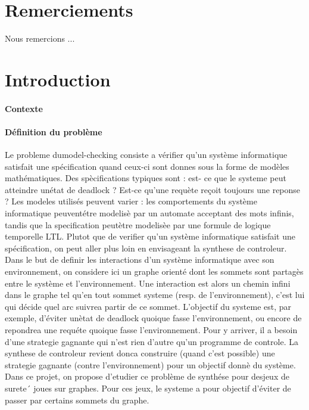 \documentclass[12pt,a4paper,oneside, titlepage]{report}
\begin{document}

{}
\chapter*{Remerciements}
\renewcommand{\leftmark}{REMERCIEMENTS}

Nous remercions ...\\

\newpage
\renewcommand{\leftmark}{TABLE DES MATI\`{E}RES}
\thispagestyle{fancy}
\tableofcontents


\newpage
{}
\renewcommand{\leftmark}{INTRODUCTION}
\chapter{Introduction}
\subsubsection*{Contexte}
\subsubsection*{Définition du problème}
Le probleme dumodel-checking consiste a vérifier qu’un système informatique satisfait une spécification
quand ceux-ci sont donnes sous la forme de modèles mathématiques. Des spècifications typiques sont : est-
ce que le systeme peut atteindre unétat de deadlock ? Est-ce qu’une requète reçoit toujours une reponse ?
Les modeles utilisés peuvent varier : les comportements du système informatique peuventétre modelisè
par un automate acceptant des mots infinis, tandis que la specification peutètre modelisèe par une formule
de logique temporelle LTL.
Plutot que de verifier qu’un système informatique satisfait une spécification, on peut aller plus loin en
envisageant la synthese de controleur. Dans le but de definir les interactions d’un système informatique
avec son environnement, on considere ici un graphe orienté dont les sommets sont partagès entre le système
et l’environnement. Une interaction est alors un chemin infini dans le graphe tel qu’en tout sommet 
systeme (resp. de l’environnement), c’est lui qui décide quel arc suivrea partir de ce sommet. L’objectif
du systeme est, par exemple, d’éviter unètat de deadlock quoique fasse l’environnement, ou encore de
repondrea une requéte quoique fasse l’environnement. Pour y arriver, il a besoin d’une strategie gagnante
qui n’est rien d’autre qu’un programme de controle. La synthese de controleur revient donca construire
(quand c’est possible) une strategie gagnante (contre l’environnement) pour un objectif donnè du système.
Dans ce projet, on propose d’etudier ce problème de synthése pour desjeux de surete´ joues sur graphes.
Pour ces jeux, le systeme a pour objectif d’éviter de passer par certains sommets du graphe.  
\end{document}
